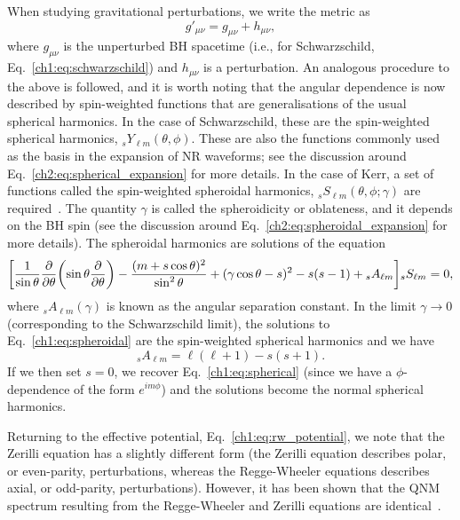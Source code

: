 When studying gravitational perturbations, we write the metric as
\begin{equation}
    g'_{\mu\nu} = g_{\mu\nu} + h_{\mu\nu},
\end{equation}
where $g_{\mu\nu}$ is the unperturbed BH spacetime (i.e., for Schwarzschild, Eq.~\ref{ch1:eq:schwarzschild}) and $h_{\mu\nu}$ is a perturbation. 
An analogous procedure to the above is followed, and it is worth noting that the angular dependence is now described by spin-weighted functions that are generalisations of the usual spherical harmonics.
In the case of Schwarzschild, these are the spin-weighted spherical harmonics, ${}_sY_{\ell m}(\theta,\phi)$.
These are also the functions commonly used as the basis in the expansion of NR waveforms; see the discussion around Eq.~\ref{ch2:eq:spherical_expansion} for more details.
In the case of Kerr, a set of functions called the spin-weighted spheroidal harmonics, ${}_{s}S_{\ell m}(\theta, \phi; \gamma)$ are required~\cite{Teukolsky:1973ha}.
The quantity $\gamma$ is called the spheroidicity or oblateness, and it depends on the BH spin (see the discussion around Eq.~\ref{ch2:eq:spheroidal_expansion} for more details).
The spheroidal harmonics are solutions of the equation
\begin{equation}\label{ch1:eq:spheroidal}
    \qty[\frac{1}{\sin{\theta}} \pdv{\theta} \qty(\sin{\theta} \pdv{\theta} ) - \frac{(m + s\cos{\theta})^2}{\sin^2{\theta}} + (\gamma\cos{\theta} - s)^2 - s(s-1) + {}_sA_{\ell m}] {}_{s}S_{\ell m}  = 0,
\end{equation}
where ${}_sA_{\ell m}(\gamma)$ is known as the angular separation constant.
In the limit $\gamma \rightarrow 0$ (corresponding to the Schwarzschild limit), the solutions to Eq.~\ref{ch1:eq:spheroidal} are the spin-weighted spherical harmonics and we have
\begin{equation}
    {}_sA_{\ell m} = \ell(\ell + 1) - s(s + 1).
\end{equation}
If we then set $s = 0$, we recover Eq.~\ref{ch1:eq:spherical} (since we have a $\phi$-dependence of the form $e^{im\phi}$) and the solutions become the normal spherical harmonics.

Returning to the effective potential, Eq.~\ref{ch1:eq:rw_potential}, we note that the Zerilli equation has a slightly different form (the Zerilli equation describes polar, or even-parity, perturbations, whereas the Regge-Wheeler equations describes axial, or odd-parity, perturbations). 
However, it has been shown that the QNM spectrum resulting from the Regge-Wheeler and Zerilli equations are identical~\cite{Chandrasekhar:1975nkd}.

